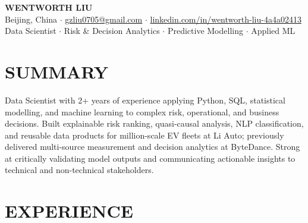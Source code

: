\documentclass[a4paper,10pt]{article}
\begin{document}
\begin{center}
    {\Large\bfseries WENTWORTH LIU}\\[2pt]
    {\small Beijing, China \;$\cdot$\; \href{mailto:gzliu0705@gmail.com}{gzliu0705@gmail.com} \;$\cdot$\; \href{https://www.linkedin.com/in/wentworth-liu-4a4a02413/}{linkedin.com/in/wentworth-liu-4a4a02413}}\\[2pt]
    {\small Data Scientist \;$\cdot$\; Risk \& Decision Analytics \;$\cdot$\; Predictive Modelling \;$\cdot$\; Applied ML}
\end{center}

\vspace{-3pt}

\section{SUMMARY}
Data Scientist with 2+ years of experience applying Python, SQL, statistical modelling, and machine learning to complex risk, operational, and business decisions. Built explainable risk ranking, quasi-causal analysis, NLP classification, and reusable data products for million-scale EV fleets at Li Auto; previously delivered multi-source measurement and decision analytics at ByteDance. Strong at critically validating model outputs and communicating actionable insights to technical and non-technical stakeholders.

\section{EXPERIENCE}
\end{document}
